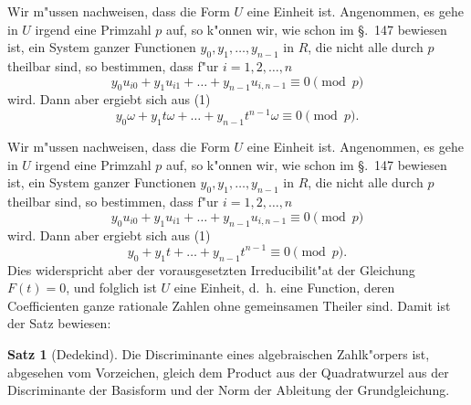 \documentclass[12pt,a4paper]{article}
\theoremstyle{definition}
\newtheorem*{satz}{Satz}
\begin{document}
Wir m"ussen nachweisen, dass die Form $U$ eine Einheit ist. Angenommen, es gehe in $U$ irgend eine Primzahl $p$ auf, so k"onnen wir, wie schon im \S.~147 bewiesen ist, ein System ganzer Functionen $y_0, y_1, \dots, y_{n-1}$ in $R$, die nicht alle durch $p$ theilbar sind, so bestimmen, dass f"ur $i = 1, 2, \dots, n$
\begin{equation}
y_0 u_{i0} + y_1 u_{i1} + \dots + y_{n-1} u_{i,n-1} \equiv 0 \pmod{p}
\end{equation}
wird. Dann aber ergiebt sich aus (1)
\begin{equation}
y_0 \omega + y_1 t\omega + \dots + y_{n-1} t^{n-1}\omega \equiv 0 \pmod{p}.
\end{equation}

Wir m"ussen nachweisen, dass die Form $U$ eine Einheit ist. Angenommen, es gehe in $U$ irgend eine Primzahl $p$ auf, so k"onnen wir, wie schon im \S.~147 bewiesen ist, ein System ganzer Functionen $y_0, y_1, \dots, y_{n-1}$ in $R$, die nicht alle durch $p$ theilbar sind, so bestimmen, dass f"ur $i = 1, 2, \dots, n$
\begin{equation}
y_0 u_{i0} + y_1 u_{i1} + \dots + y_{n-1} u_{i,n-1} \equiv 0 \pmod{p}
\end{equation}
wird. Dann aber ergiebt sich aus (1)
\begin{equation}
y_0 + y_1 t + \dots + y_{n-1} t^{n-1} \equiv 0 \pmod{p}.
\end{equation}
Dies widerspricht aber der vorausgesetzten Irreducibilit"at der Gleichung $F(t) = 0$, und folglich ist $U$ eine Einheit, d.~h. eine Function, deren Coefficienten ganze rationale Zahlen ohne gemeinsamen Theiler sind. Damit ist der Satz bewiesen:

\begin{satz}[Dedekind]
Die Discriminante eines algebraischen Zahlk"orpers ist, abgesehen vom Vorzeichen, gleich dem Product aus der Quadratwurzel aus der Discriminante der Basisform und der Norm der Ableitung der Grundgleichung.
\end{satz}
\end{document}
